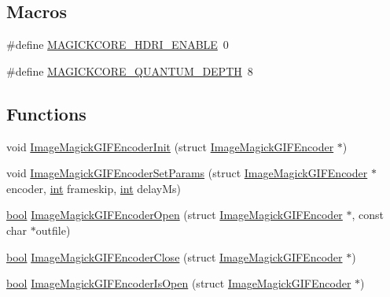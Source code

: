 \subsection*{Macros}
\begin{DoxyCompactItemize}
\item 
\#define \mbox{\hyperlink{imagemagick-gif-encoder_8h_ae44e8112b97c941c63fb4cf98c5e0b53}{M\+A\+G\+I\+C\+K\+C\+O\+R\+E\+\_\+\+H\+D\+R\+I\+\_\+\+E\+N\+A\+B\+LE}}~0
\item 
\#define \mbox{\hyperlink{imagemagick-gif-encoder_8h_a6882928d475fe57c8b23c2f42549fad3}{M\+A\+G\+I\+C\+K\+C\+O\+R\+E\+\_\+\+Q\+U\+A\+N\+T\+U\+M\+\_\+\+D\+E\+P\+TH}}~8
\end{DoxyCompactItemize}
\subsection*{Functions}
\begin{DoxyCompactItemize}
\item 
void \mbox{\hyperlink{imagemagick-gif-encoder_8h_a4e6792b03fca56bec992859842ec4b58}{Image\+Magick\+G\+I\+F\+Encoder\+Init}} (struct \mbox{\hyperlink{imagemagick-gif-encoder_8h_struct_image_magick_g_i_f_encoder}{Image\+Magick\+G\+I\+F\+Encoder}} $\ast$)
\item 
void \mbox{\hyperlink{imagemagick-gif-encoder_8h_a40b53230d8a8b3b36048085d06d9d029}{Image\+Magick\+G\+I\+F\+Encoder\+Set\+Params}} (struct \mbox{\hyperlink{imagemagick-gif-encoder_8h_struct_image_magick_g_i_f_encoder}{Image\+Magick\+G\+I\+F\+Encoder}} $\ast$encoder, \mbox{\hyperlink{ioapi_8h_a787fa3cf048117ba7123753c1e74fcd6}{int}} frameskip, \mbox{\hyperlink{ioapi_8h_a787fa3cf048117ba7123753c1e74fcd6}{int}} delay\+Ms)
\item 
\mbox{\hyperlink{libretro_8h_a4a26dcae73fb7e1528214a068aca317e}{bool}} \mbox{\hyperlink{imagemagick-gif-encoder_8h_aaf05fdd1e4979c7a1fe1894cecf81f11}{Image\+Magick\+G\+I\+F\+Encoder\+Open}} (struct \mbox{\hyperlink{imagemagick-gif-encoder_8h_struct_image_magick_g_i_f_encoder}{Image\+Magick\+G\+I\+F\+Encoder}} $\ast$, const char $\ast$outfile)
\item 
\mbox{\hyperlink{libretro_8h_a4a26dcae73fb7e1528214a068aca317e}{bool}} \mbox{\hyperlink{imagemagick-gif-encoder_8h_a9bd69f1ac5e6c5edd3032e2bb25e35bf}{Image\+Magick\+G\+I\+F\+Encoder\+Close}} (struct \mbox{\hyperlink{imagemagick-gif-encoder_8h_struct_image_magick_g_i_f_encoder}{Image\+Magick\+G\+I\+F\+Encoder}} $\ast$)
\item 
\mbox{\hyperlink{libretro_8h_a4a26dcae73fb7e1528214a068aca317e}{bool}} \mbox{\hyperlink{imagemagick-gif-encoder_8h_ab7a661289de539d3a9e6677ea3b45522}{Image\+Magick\+G\+I\+F\+Encoder\+Is\+Open}} (struct \mbox{\hyperlink{imagemagick-gif-encoder_8h_struct_image_magick_g_i_f_encoder}{Image\+Magick\+G\+I\+F\+Encoder}} $\ast$)
\end{DoxyCompactItemize}


